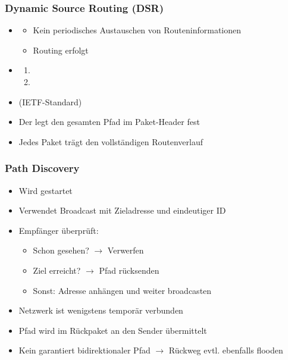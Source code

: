 \subsubsection*{Dynamic Source Routing (DSR)}
\begin{itemize}
    \item {}
    \begin{itemize}
        \item Kein periodisches Austauschen von Routeninformationen
        \item Routing erfolgt 
    \end{itemize}
    \item {}
    \begin{enumerate}
        \item {}
        \item {}
    \end{enumerate}
    \item {} (IETF-Standard)
\end{itemize}
\begin{itemize}
    \item Der  legt den gesamten Pfad im Paket-Header fest
    \item Jedes Paket trägt den vollständigen Routenverlauf
\end{itemize}
\subsubsection*{Path Discovery}
\begin{itemize}
    \item Wird  gestartet
    \item Verwendet  Broadcast mit Zieladresse und eindeutiger ID
    \item Empfänger überprüft:
    \begin{itemize}
        \item Schon gesehen? $\rightarrow$ Verwerfen
        \item Ziel erreicht? $\rightarrow$ Pfad rücksenden
        \item Sonst: Adresse anhängen und weiter broadcasten
    \end{itemize}
    \item {} Netzwerk ist wenigstens temporär verbunden
    \item Pfad wird im Rückpaket an den Sender übermittelt
    \item {} Kein garantiert bidirektionaler Pfad $\rightarrow$ Rückweg evtl. ebenfalls flooden
\end{itemize}
